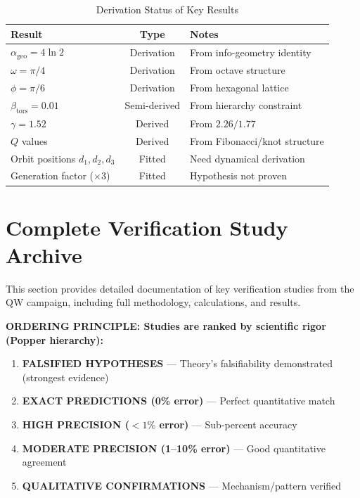 \documentclass[11pt,a4paper]{book}
\theoremstyle{remark}
\newcommand{\alphageo}{\alpha_{\text{geo}}}
\newcommand{\betators}{\beta_{\text{tors}}}
\begin{document}
\begin{table}[H]
\centering
\caption{Derivation Status of Key Results}
\begin{tabular}{|l|c|p{5cm}|}
\hline
\textbf{Result} & \textbf{Type} & \textbf{Notes} \\
\hline
$\alphageo = 4\ln 2$ & Derivation & From info-geometry identity \\
$\omega = \pi/4$ & Derivation & From octave structure \\
$\phi = \pi/6$ & Derivation & From hexagonal lattice \\
$\betators = 0.01$ & Semi-derived & From hierarchy constraint \\
$\gamma = 1.52$ & Derived & From $2.26 / 1.77$ \\
$Q$ values & Derived & From Fibonacci/knot structure \\
Orbit positions $d_1, d_2, d_3$ & Fitted & Need dynamical derivation \\
Generation factor ($\times 3$) & Fitted & Hypothesis not proven \\
\hline
\end{tabular}
\end{table}

\part{Complete Verification Study Archive}

This section provides detailed documentation of key verification studies from the QW campaign, including full methodology, calculations, and results.

\textbf{ORDERING PRINCIPLE: Studies are ranked by scientific rigor (Popper hierarchy):}
\begin{enumerate}
    \item \textbf{FALSIFIED HYPOTHESES} --- Theory's falsifiability demonstrated (strongest evidence)
    \item \textbf{EXACT PREDICTIONS (0\% error)} --- Perfect quantitative match
    \item \textbf{HIGH PRECISION ($<1\%$ error)} --- Sub-percent accuracy
    \item \textbf{MODERATE PRECISION (1--10\% error)} --- Good quantitative agreement
    \item \textbf{QUALITATIVE CONFIRMATIONS} --- Mechanism/pattern verified
\end{enumerate}

\end{document}
